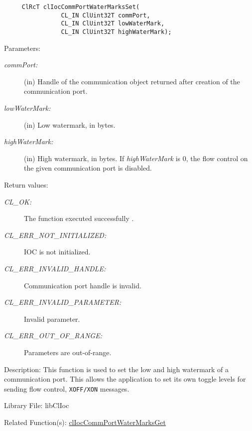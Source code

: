 \begin{flushleft}
\begin{Desc}
\footnotesize\begin{verbatim}     ClRcT clIocCommPortWaterMarksSet(
                CL_IN ClUint32T commPort,
                CL_IN ClUint32T lowWaterMark,
                CL_IN ClUint32T highWaterMark);
\end{verbatim}
\normalsize
\end{Desc}
\begin{Desc}
\item[Parameters:]
\begin{description}
\item[{\em comm\-Port:}](in) Handle of the communication object returned after creation of the communication port. 
\item[{\em low\-Water\-Mark:}](in) Low watermark, in bytes. \item[{\em high\-Water\-Mark:}](in) High watermark, in bytes. If {\em high\-Water\-Mark} is 0,
the flow control on the given communication port is disabled.\end{description}
\end{Desc}
\begin{Desc}
\item[Return values:]
\begin{description}
\item[{\em CL\_\-OK:}]The function executed successfully . \item[{\em CL\_\-ERR\_\-NOT\_\-INITIALIZED:}] IOC is not initialized. 
\item[{\em CL\_\-ERR\_\-INVALID\_\-HANDLE:}]Communication port handle is invalid. 
\item[{\em CL\_\-ERR\_\-INVALID\_\-PARAMETER:}]Invalid parameter. 
\item[{\em CL\_\-ERR\_\-OUT\_\-OF\_\-RANGE:}]Parameters are out-of-range.\end{description}
\end{Desc}
\begin{Desc}
\item[Description:]This function is used to set the low and high watermark of a communication port. This allows the application to set its own toggle 
levels for sending flow control, {\tt{XOFF/XON}} messages.\end{Desc}
\begin{Desc}
\item[Library File:]libClIoc\end{Desc}
\begin{Desc}
\item[Related Function(s):]\hyperlink{pageioc201}{cl\-Ioc\-Comm\-Port\-Water\-Marks\-Get} \end{Desc}
\newpage




\end{flushleft}
